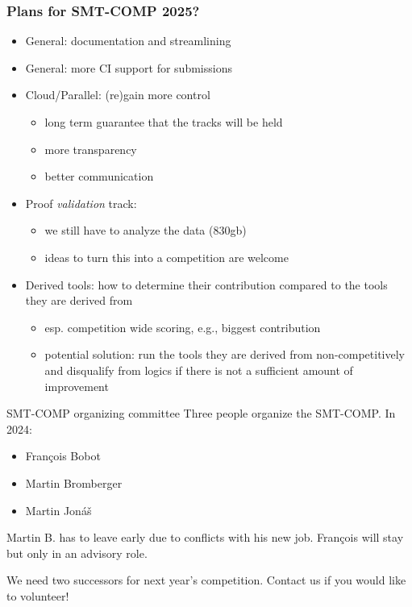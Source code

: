\documentclass[table]{beamer}
\begin{document}
\begin{frame}[fragile]
  \frametitle{Plans for SMT-COMP 2025?}
  \begin{itemize}
    \item<1-> General: documentation and streamlining
    \item<2-> General: more CI support for submissions
    \item<3-> Cloud/Parallel: (re)gain more control
      \begin{itemize}
        \item<4-> long term guarantee that the tracks will be held
        \item<5-> more transparency
        \item<6-> better communication
      \end{itemize}
    \item<7-> Proof \textit{validation} track:
      \begin{itemize}
        \item<8-> we still have to analyze the data (830gb)
        \item<9-> ideas to turn this into a competition are welcome
      \end{itemize}
    \item<10-> Derived tools: how to determine their contribution compared to the tools they are derived from
      \begin{itemize}
        \item<11-> esp. competition wide scoring, e.g., biggest contribution
        \item<12-> potential solution: run the tools they are derived from non-competitively and disqualify from logics if there is not a sufficient amount of improvement
      \end{itemize}
  \end{itemize}
\end{frame}

%    
%
%
%

\begin{frame}{SMT-COMP organizing committee}
  Three people organize the SMT-COMP.  In 2024:
  \begin{itemize}
  \item Fran\c{c}ois Bobot
  \item Martin Bromberger
  \item Martin Jon\'{a}\v{s}
  \end{itemize}
  \bigskip

  Martin B. has to leave early due to conflicts with his new job.\newline\newline
  Fran\c{c}ois will stay but only in an advisory role.
  \bigskip

  We need two successors for next year's competition.
  Contact us if you would like to volunteer!
\end{frame}
\end{document}
